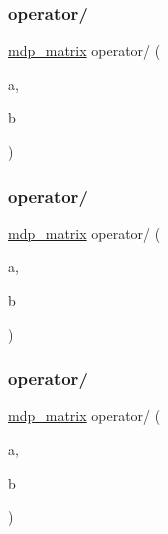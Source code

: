 \mbox{\label{classmdp__matrix_afaf1606b270d6b334329a5cdf9a1c959}} 
\subsubsection{\texorpdfstring{operator/}{operator/}\hspace{0.1cm}{\footnotesize\ttfamily [2/5]}}
{\footnotesize\ttfamily \hyperlink{classmdp__matrix}{mdp\+\_\+matrix} operator/ (\begin{DoxyParamCaption}\item[{const \hyperlink{classmdp__matrix}{mdp\+\_\+matrix} \&}]{a,  }\item[{\hyperlink{classmdp__complex}{mdp\+\_\+complex}}]{b }\end{DoxyParamCaption})\hspace{0.3cm}{\ttfamily [friend]}}

\mbox{\label{classmdp__matrix_a5a1dfe012e3c2ab574f2c60f943b36e3}} 
\subsubsection{\texorpdfstring{operator/}{operator/}\hspace{0.1cm}{\footnotesize\ttfamily [3/5]}}
{\footnotesize\ttfamily \hyperlink{classmdp__matrix}{mdp\+\_\+matrix} operator/ (\begin{DoxyParamCaption}\item[{\hyperlink{classmdp__complex}{mdp\+\_\+complex}}]{a,  }\item[{const \hyperlink{classmdp__matrix}{mdp\+\_\+matrix} \&}]{b }\end{DoxyParamCaption})\hspace{0.3cm}{\ttfamily [friend]}}

\mbox{\label{classmdp__matrix_af30fb437e246a2f03a7b9c22a0e6624a}} 
\subsubsection{\texorpdfstring{operator/}{operator/}\hspace{0.1cm}{\footnotesize\ttfamily [4/5]}}
{\footnotesize\ttfamily \hyperlink{classmdp__matrix}{mdp\+\_\+matrix} operator/ (\begin{DoxyParamCaption}\item[{const \hyperlink{classmdp__matrix}{mdp\+\_\+matrix} \&}]{a,  }\item[{\hyperlink{mdp__global__vars_8h_a69d96b74c791e0bbdb888b3913a69450}{mdp\+\_\+real}}]{b }\end{DoxyParamCaption})\hspace{0.3cm}{\ttfamily [friend]}}

